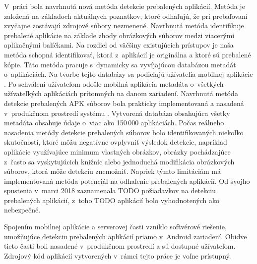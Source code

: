 V~práci bola navrhnutá nová metóda detekcie prebalených aplikácií. Metóda je založená na základoch aktuálnych poznatkov, ktoré odhaľujú, že pri prebaľovaní zvyčajne zostávajú zdrojové súbory nezmenené. Navrhnutá metóda identifikuje prebalené aplikácie na základe zhody obrázkových súborov medzi viacerými aplikačnými balíčkami. Na rozdiel od väčšiny existujúcich prístupov je naša metóda schopná identifikovať, ktorá z~aplikácií je originálna a ktoré sú prebalené kópie. Táto metóda pracuje s~dynamicky sa vyvíjajúcou databázou metadát o~aplikáciách. Na tvorbe tejto databázy sa podieľajú užívatelia mobilnej aplikácie . Po schválení užívateľom odošle mobilná aplikácia metadáta o~všetkých užívateľkých aplikáciách prítomných na danom zariadení. Navrhnutá metóda detekcie prebalených APK súborov bola prakticky implementovaná a nasadená v~produkčnom prostredí systému .
Vytvorená databáza obsahujúca všetky metadáta obsahuje údaje o~viac ako 150\,000 aplikáciách. Počas reálneho nasadenia metódy detekcie prebalených súborov bolo identifikovaných niekoľko skutočností, ktoré môžu negatívne ovplyvniť výsledok detekcie, napríklad aplikácie využívajúce minimum vlastných obrázkov, obrázky pochádzajúce z~často sa vyskytujúcich knižníc alebo jednoduchá modifikácia obrázkových súborov, ktorá môže detekciu znemožniť. Napriek týmto limitáciám má implementovaná metóda potenciál na odhalenie prebalených aplikácií. Od svojho spustenia v~marci 2018 zaznamenala TODO požiadavkov na detekciu prebalených aplikácií, z~toho TODO aplikácií bolo vyhodnotených ako nebezpečné.

Spojením mobilnej aplikácie a serverovej časti vzniklo softvérové riešenie, umožňujúce detekciu prebalených aplikácií priamo v~Android zariadení. Obidve tieto časti boli nasadené v~produkčnom prostredí a sú dostupné užívateľom. Zdrojový kód aplikácií vytvorených v~rámci tejto práce je voľne prístupný.
